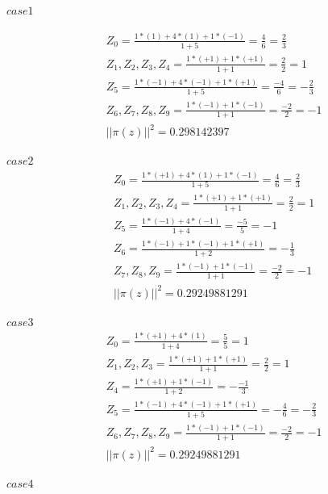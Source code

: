 $case1$

\begin{equation}
	\begin{aligned}
		&Z_0 = \frac{1*(1) + 4*(1)+1*(-1)}{1 + 5} = \frac{4}{6} = \frac{2}{3}\\
		&Z_1,Z_2,Z_3,Z_4 = \frac{1*(+1) + 1*(+1)}{1 + 1} = \frac{2}{2} = 1\\
		&Z_5 = \frac{1*(-1) + 4*(-1) +1*(+1)}{1 + 5} = \frac{-4}{6} =  -\frac{2}{3}\\
		&Z_6,Z_7,Z_8,Z_9 = \frac{1*(-1) + 1*(-1)}{1 + 1} = \frac{-2}{2} = -1\\
		&||\pi(z)||^2 = 0.298142397
	\end{aligned}
\end{equation}

$case2$
\begin{equation}
	\begin{aligned}
		&Z_0 = \frac{1*(+1) + 4*(1)+1*(-1)}{1 + 5} = \frac{4}{6} = \frac{2}{3}\\
		&Z_1,Z_2,Z_3,Z_4 = \frac{1*(+1) + 1*(+1)}{1 + 1} = \frac{2}{2} = 1\\
		&Z_5 = \frac{1*(-1) + 4*(-1)}{1 + 4} = \frac{-5}{5} = -1\\
		&Z_6 = \frac{1*(-1)+1*(-1) + 1*(+1)}{1+2}=-\frac{1}{3}\\
		&Z_7,Z_8,Z_9 = \frac{1*(-1) + 1*(-1)}{1 + 1} = \frac{-2}{2} = -1\\
		&||\pi(z)||^2 = 0.29249881291
	\end{aligned}
\end{equation}


$case3$
\begin{equation}
	\begin{aligned}
		&Z_0 = \frac{1*(+1) + 4*(1)}{1 + 4} = \frac{5}{5} = 1\\
		&Z_1,Z_2,Z_3 = \frac{1*(+1) + 1*(+1)}{1 + 1} = \frac{2}{2} = 1\\
		&Z_4 = \frac{1*(+1) + 1*(-1)}{1 + 2} = -\frac{-1}{3}\\
		&Z_5 = \frac{1*(-1)+4*(-1) + 1*(+1)}{1+5}=-\frac{4}{6}=-\frac{2}{3}\\
		&Z_6,Z_7,Z_8,Z_9 = \frac{1*(-1) + 1*(-1)}{1 + 1} = \frac{-2}{2} = -1\\
		&||\pi(z)||^2  = 0.29249881291
	\end{aligned}
\end{equation}


$case4$

